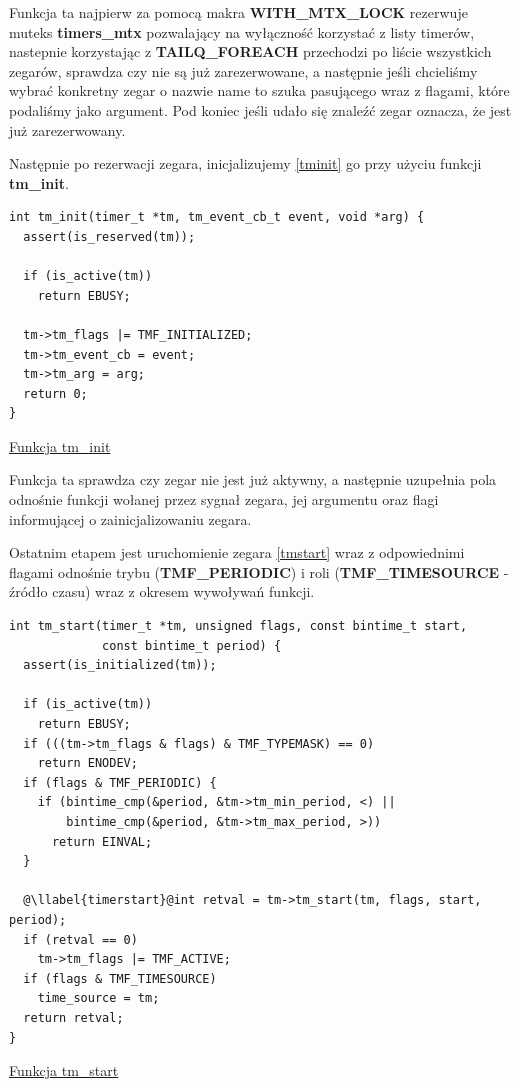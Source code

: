 \documentclass[shortabstract]{iithesis}
\makeatletter
\theoremstyle{definition} \newtheorem*{definition}{Definicja}
\theoremstyle{definition} \newtheorem*{example}{Przykład}
\theoremstyle{definition} \newtheorem*{remark}{Uwaga}
\newenvironment{longlisting}{\captionsetup{type=listing}}{}
\newcounter{llabel}[listing]%
\renewcommand*{\thellabel}{%
    \ifnum\value{llabel}<0 %
      \@ctrerr
    \else
      \ifnum\value{llabel}>10 %
        \@ctrerr
      \else
        \protect\ding{\the\numexpr\value{llabel}+201\relax}%
      \fi
    \fi
  }%
\newlength{\llabelsep}
\newcommand*{\llabel}[1]{%
  \begingroup
  \refstepcounter{llabel}%
  \label{#1}%
  \llap{\thellabel\kern\llabelsep}%
  \endgroup
}
\makeatother
\begin{document}
Funkcja ta najpierw za pomocą makra \textbf{WITH\_MTX\_LOCK} rezerwuje muteks \textbf{timers\_mtx} pozwalający na wyłączność korzystać z listy timerów, nastepnie korzystając z \textbf{TAILQ\_FOREACH} przechodzi po liście wszystkich zegarów, sprawdza czy nie są już zarezerwowane, a następnie jeśli chcieliśmy wybrać konkretny zegar o nazwie name to szuka pasującego wraz z flagami, które podaliśmy jako argument. Pod koniec jeśli udało się znaleźć zegar oznacza, że jest już zarezerwowany.

Następnie po rezerwacji zegara, inicjalizujemy \ref{tminit} go przy użyciu funkcji \textbf{tm\_init}.

\begin{longlisting}
  \begin{verbatim}
int tm_init(timer_t *tm, tm_event_cb_t event, void *arg) {
  assert(is_reserved(tm));

  if (is_active(tm))
    return EBUSY;

  tm->tm_flags |= TMF_INITIALIZED;
  tm->tm_event_cb = event;
  tm->tm_arg = arg;
  return 0;
}
  \end{verbatim}
  \caption{\href{https://mimiker.ii.uni.wroc.pl/source/xref/mimiker/sys/kern/timer.c?r=3547949d\#119}{Funkcja tm\_init}}
  \label{lst:functminit}
\end{longlisting}

Funkcja ta sprawdza czy zegar nie jest już aktywny, a następnie uzupełnia pola odnośnie funkcji wołanej przez sygnał zegara, jej argumentu oraz flagi informującej o zainicjalizowaniu zegara.

Ostatnim etapem jest uruchomienie zegara \ref{tmstart} wraz z odpowiednimi flagami odnośnie trybu (\textbf{TMF\_PERIODIC}) i roli (\textbf{TMF\_TIMESOURCE} - źródło czasu) wraz z okresem wywoływań funkcji.

\begin{longlisting}
  \begin{verbatim}
int tm_start(timer_t *tm, unsigned flags, const bintime_t start,
             const bintime_t period) {
  assert(is_initialized(tm));

  if (is_active(tm))
    return EBUSY;
  if (((tm->tm_flags & flags) & TMF_TYPEMASK) == 0)
    return ENODEV;
  if (flags & TMF_PERIODIC) {
    if (bintime_cmp(&period, &tm->tm_min_period, <) ||
        bintime_cmp(&period, &tm->tm_max_period, >))
      return EINVAL;
  }

  @\llabel{timerstart}@int retval = tm->tm_start(tm, flags, start, period);
  if (retval == 0)
    tm->tm_flags |= TMF_ACTIVE;
  if (flags & TMF_TIMESOURCE)
    time_source = tm;
  return retval;
}
  \end{verbatim}
  \caption{\href{https://mimiker.ii.uni.wroc.pl/source/xref/mimiker/sys/kern/timer.c?r=3547949d\#131}{Funkcja tm\_start}}
  \label{lst:functmstart}
\end{longlisting}
\end{document}
